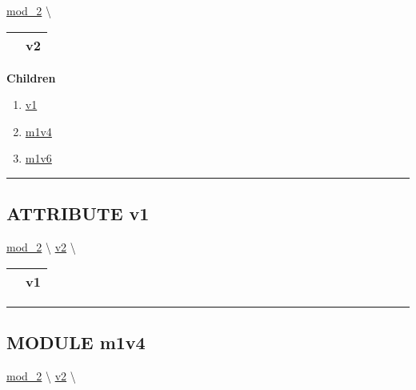 \hypertarget{ecldoc:mod_1}{}
\hspace{0pt} \hyperlink{ecldoc:mod_2}{mod_2} \textbackslash 

{\renewcommand{\arraystretch}{1.5}
\begin{tabularx}{\textwidth}{|>{\raggedright\arraybackslash}l|X|}
\hline
\hspace{0pt}\mytexttt{\color{red} } & \textbf{v2} \\
\hline
\end{tabularx}
}

\par


\textbf{Children}
\begin{enumerate}
\item \hyperlink{ecldoc:mod_1.v1}{v1}
\item \hyperlink{ecldoc:mod_1.m1v4}{m1v4}
\item \hyperlink{ecldoc:mod_1.m1v6}{m1v6}
\end{enumerate}

\rule{\linewidth}{0.5pt}

\subsection*{\textsf{\colorbox{headtoc}{\color{white} ATTRIBUTE}
v1}}

\hypertarget{ecldoc:mod_1.v1}{}
\hspace{0pt} \hyperlink{ecldoc:mod_2}{mod_2} \textbackslash 
\hspace{0pt} \hyperlink{ecldoc:mod_1}{v2} \textbackslash 

{\renewcommand{\arraystretch}{1.5}
\begin{tabularx}{\textwidth}{|>{\raggedright\arraybackslash}l|X|}
\hline
\hspace{0pt}\mytexttt{\color{red} } & \textbf{v1} \\
\hline
\end{tabularx}
}

\par


\rule{\linewidth}{0.5pt}
\subsection*{\textsf{\colorbox{headtoc}{\color{white} MODULE}
m1v4}}

\hypertarget{ecldoc:mod_1.m1v4}{}
\hspace{0pt} \hyperlink{ecldoc:mod_2}{mod_2} \textbackslash 
\hspace{0pt} \hyperlink{ecldoc:mod_1}{v2} \textbackslash 

